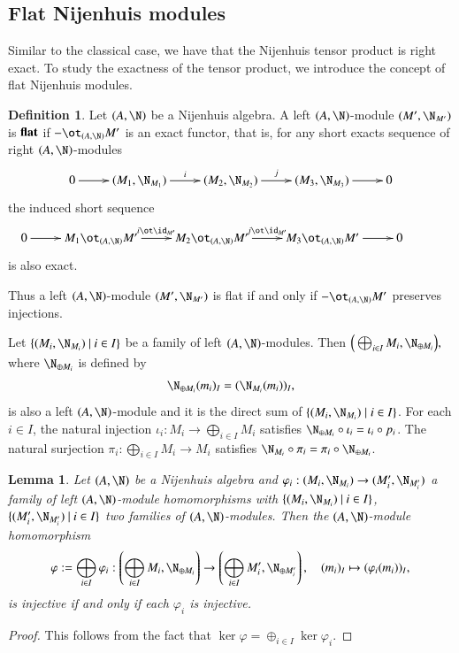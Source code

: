 \documentclass[12pt]{amsart}
\newtheorem{lemma}[theorem]{Lemma}
\theoremstyle{definition}
\newtheorem{defn}[theorem]{Definition}
\begin{document}
\subsection{Flat Nijenhuis modules}
Similar to the classical case, we have that the Nijenhuis tensor product is right exact. To study the exactness of the tensor product, we introduce the concept of flat Nijenhuis modules.

\begin{defn}
Let $(A,\N)$ be a Nijenhuis algebra. A left $(A,\N)$-module $(M',\N_{M'})$ is $\bf flat$ if $- \ot_{(A,\N)} M'$ is an exact functor, that is, for any short exacts sequence of right $(A,\N)$-modules
$$
\xymatrix{
0\ar[r]&(M_1,\N_{M_1})\ar^{i}[r]&(M_2,\N_{M_2})\ar^{j}[r]&(M_3,\N_{M_3})\ar[r]& 0
}
$$
the induced short sequence
$$
\xymatrix{
0\ar[r]& M_1 \ot_{(A,\N)} M' \ar^{i \ot \id_{M'}}[r]& M_2 \ot_{(A,\N)} M' \ar^{ j\ot \id_{M'}}[r]& M_3\ot_{(A,\N)} M'\ar[r]& 0&}
$$
is also exact.
\end{defn}

Thus a left $(A,\N)$-module $(M',\N_{M'})$ is flat if and only if $- \ot_{(A,\N)} M'$ preserves injections.



Let $\{(M_{i},\N_{M_i})~|~i \in I \}$ be a family of left $(A,\N)$-modules. Then $\Big(\bigoplus_{i\in I}M_{i},\N_{\oplus M_i} \Big),$
where $\N_{\oplus M_i}$ is defined by
\begin{align*}
\N_{\oplus M_i}(m_{i})_{I} = (\N_{M_i}(m_{i}))_{I},   
\end{align*}
is also a left $(A,\N)$-module and it is the direct sum of $\{(M_i, \N_{M_i}) \mid i \in I \}$. For each $i\in I$, the natural injection $\iota_{i}: M_{i} \to \bigoplus_{i\in I} M_{i}$ satisfies $ \N_{\oplus M_i} \circ \iota_{i}=\iota_{i}\circ p_{i}$. The natural surjection $\pi_{i}: \bigoplus_{i\in I} M_{i} \to M_{i}$ satisfies $\N_{M_i}\circ \pi_{i}=\pi_{i}\circ \N_{\oplus M_i}$. 

\begin{lemma}\label{dir-sum-injective}
Let $(A, \N)$ be a Nijenhuis algebra and $\varphi_i: (M_{i},\N_{M_i}) \to (M'_{i},\N_{M'_i})$ a family of left $(A,\N)$-module homomorphisms with  $\{(M_{i},\N_{M_i})~|~i \in I \}$, $\{(M'_{i},\N_{M'_i})~|~i \in I \}$ two families of $(A,\N)$-modules. Then the $(A, \N)$-module homomorphism
$$\varphi:= \bigoplus_{i\in I}\varphi_i: \left( \bigoplus_{i\in I} M_{i},\N_{\oplus M_i} \right) \to \left( \bigoplus_{i\in I} M'_{i},\N_{\oplus M'_i} \right), \quad
(m_{i})_{I} \mapsto (\varphi_{i}(m_{i}))_{I},
$$
is injective if and only if each $\varphi_{i}$ is injective.
\end{lemma}
\begin{proof}
This follows from the fact that $\ker \varphi = \oplus_{i\in I} \ker \varphi_i$.
\end{proof}
\end{document}
